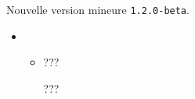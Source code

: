 Nouvelle version mineure \verb+1.2.0-beta+.

\begin{itemize}[itemsep=.5em]
    \item {}
    \begin{itemize}[itemsep=.5em]
        \item ???

              \smallskip

              ???
    \end{itemize}





    \separation
\end{itemize}